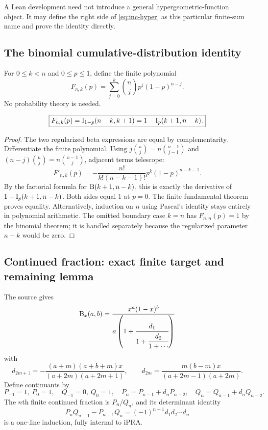 A Lean development need not introduce a general hypergeometric-function object.  It may define the right side of \eqref{eq:inc-hyper} as this particular finite-sum name and prove the identity directly.

\subsection{The binomial cumulative-distribution identity}

For $0\le k<n$ and $0\le p\le1$, define the finite polynomial
\[
 F_{n,k}(p)=\sum_{j=0}^{k}\binom nj p^j(1-p)^{n-j}.
\]
No probability theory is needed.

\begin{theorem}\label{thm:binomial-cdf}
\[
 \boxed{
 F_{n,k}(p)=\mathrm I_{1-p}(n-k,k+1)
 =1-\mathrm I_p(k+1,n-k).}
\]
\end{theorem}

\begin{proof}
The two regularized beta expressions are equal by complementarity.  Differentiate the finite polynomial.  Using
$j\binom nj=n\binom{n-1}{j-1}$ and
$(n-j)\binom nj=n\binom{n-1}{j}$, adjacent terms telescope:
\[
 F'_{n,k}(p)
 =-\frac{n!}{k!(n-k-1)!}p^k(1-p)^{n-k-1}.
\]
By the factorial formula for $\mathrm B(k+1,n-k)$, this is exactly the derivative of
$1-\mathrm I_p(k+1,n-k)$.  Both sides equal $1$ at $p=0$.  The finite fundamental theorem proves equality.  Alternatively, induction on $n$ using Pascal's identity stays entirely in polynomial arithmetic.  The omitted boundary case $k=n$ has $F_{n,n}(p)=1$ by the binomial theorem; it is handled separately because the regularized parameter $n-k$ would be zero.
\end{proof}

\subsection{Continued fraction: exact finite target and remaining lemma}

The source gives
\[
 \mathrm B_x(a,b)=
 \frac{x^a(1-x)^b}
 {a\left(1+\cfrac{d_1}{1+\cfrac{d_2}{1+\cdots}}\right)}
\]
with
\[
 d_{2m+1}=
 -\frac{(a+m)(a+b+m)x}{(a+2m)(a+2m+1)},
 \qquad
 d_{2m}=
 \frac{m(b-m)x}{(a+2m-1)(a+2m)}.
\]
Define continuants by
\[
 P_{-1}=1,\ P_0=1,\quad
 Q_{-1}=0,\ Q_0=1,\quad
 P_n=P_{n-1}+d_nP_{n-2},\quad
 Q_n=Q_{n-1}+d_nQ_{n-2}.
\]
The $n$th finite continued fraction is $P_n/Q_n$, and its determinant identity
\[
 P_nQ_{n-1}-P_{n-1}Q_n
 =(-1)^{n-1}d_1d_2\cdots d_n
\]
is a one-line induction, fully internal to iPRA.

